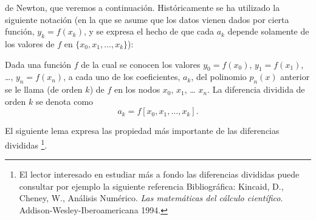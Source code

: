     de Newton, que veremos a continuación. Históricamente se ha utilizado
    la siguiente notación (en la que se asume que los datos vienen dados
    por cierta función, $y_k=f(x_k)$, y se expresa el hecho de que cada
    $a_k$ depende solamente de los valores de $f$ en
    $\{x_0,x_1,\dots,x_k\}$):
    \begin{definition}
      Dada una función $f$ de la cual se conocen los valores $y_0=f(x_0)$,
      $y_1=f(x_1)$, \dots, $y_n=f(x_n)$, 
      a cada uno de los coeficientes, $a_k$, del polinomio $p_n(x)$
      anterior se le llama  (de orden $k$) de $f$ en los nodos $x_0$, $x_1$, \dots
      $x_n$. La diferencia dividida de orden $k$ se denota como
      $$
      a_k = f[x_0,x_1,\dots,x_k].
      $$
    \end{definition}

    El siguiente lema expresa las propiedad más importante de las
    diferencias divididas%
    \footnote{El lector interesado en estudiar más a fondo las
      diferencias divididas  puede consultar por ejemplo la
      siguiente referencia Bibliográfica: Kincaid, D., Cheney, W.,
      Análisis Numérico. \textit{Las matemáticas del cálculo
        científico}. Addison-Wesley-Iberoamericana 1994.}.



